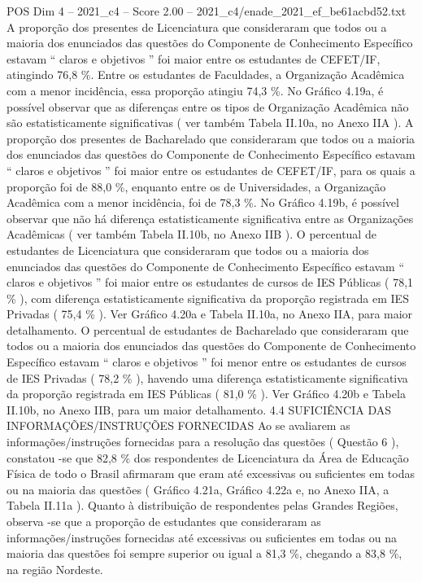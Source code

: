 \begin{textsample}{POS Dim 4 – 2021\_c4 – Score 2.00 – 2021\_c4/enade\_2021\_ef\_be61acbd52.txt}
A proporção dos presentes de Licenciatura que consideraram que todos ou a maioria dos enunciados das questões do Componente de Conhecimento Específico estavam “ claros e objetivos ” foi maior entre os estudantes de CEFET/IF, atingindo 76,8 \%.
Entre os estudantes de Faculdades, a Organização Acadêmica com a menor incidência, essa proporção atingiu 74,3 \%.
No Gráfico 4.19a, é possível observar que as diferenças entre os tipos de Organização Acadêmica não são estatisticamente significativas ( ver também Tabela II.10a, no Anexo IIA ).
A proporção dos presentes de Bacharelado que consideraram que todos ou a maioria dos enunciados das questões do Componente de Conhecimento Específico estavam “ claros e objetivos ” foi maior entre os estudantes de CEFET/IF, para os quais a proporção foi de 88,0 \%, enquanto entre os de Universidades, a Organização Acadêmica com a menor incidência, foi de 78,3 \%.
No Gráfico 4.19b, é possível observar que não há diferença estatisticamente significativa entre as Organizações Acadêmicas ( ver também Tabela II.10b, no Anexo IIB ).
O percentual de estudantes de Licenciatura que consideraram que todos ou a maioria dos enunciados das questões do Componente de Conhecimento Específico estavam “ claros e objetivos ” foi maior entre os estudantes de cursos de IES Públicas ( 78,1 \% ), com diferença estatisticamente significativa da proporção registrada em IES Privadas ( 75,4 \% ).
Ver Gráfico 4.20a e Tabela II.10a, no Anexo IIA, para maior detalhamento.
O percentual de estudantes de Bacharelado que consideraram que todos ou a maioria dos enunciados das questões do Componente de Conhecimento Específico estavam “ claros e objetivos ” foi menor entre os estudantes de cursos de IES Privadas ( 78,2 \% ), havendo uma diferença estatisticamente significativa da proporção registrada em IES Públicas ( 81,0 \% ).
Ver Gráfico 4.20b e Tabela II.10b, no Anexo IIB, para um maior detalhamento. 4.4 SUFICIÊNCIA DAS INFORMAÇÕES/INSTRUÇÕES FORNECIDAS Ao se avaliarem as informações/instruções fornecidas para a resolução das questões ( Questão 6 ), constatou -se que 82,8 \% dos respondentes de Licenciatura da Área de Educação Física de todo o Brasil afirmaram que eram até excessivas ou suficientes em todas ou na maioria das questões ( Gráfico 4.21a, Gráfico 4.22a e, no Anexo IIA, a Tabela II.11a ).
Quanto à distribuição de respondentes pelas Grandes Regiões, observa -se que a proporção de estudantes que consideraram as informações/instruções fornecidas até excessivas ou suficientes em todas ou na maioria das questões foi sempre superior ou igual a 81,3 \%, chegando a 83,8 \%, na região Nordeste.

\end{textsample}
